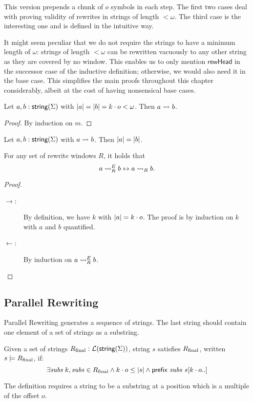 This version prepends a chunk of $o$ symbols in each step. The first two cases deal with proving validity of rewrites in strings of length $< \omega$. The third case is the interesting one and is defined in the intuitive way.

\begin{remark}
  It might seem peculiar that we do not require the strings to have a minimum length of $\omega$: strings of length $< \omega$ can be rewritten vacuously to any other string as they are covered by no window. 
  This enables us to only mention $\textsf{rewHead}$ in the successor case of the inductive definition; otherwise, we would also need it in the base case. This simplifies the main proofs throughout this chapter considerably, albeit at the cost of having nonsensical base cases.
\end{remark}

\begin{proposition}\label{lem:vacuous}
  Let $a, b : \textsf{string}{(\Sigma)}$ with $|a| = |b| = k \cdot o < \omega$. Then $a \rightsquigarrow_{} b$. 
\end{proposition}
\begin{proof}
  By induction on $m$.
\end{proof}

\begin{proposition}
  Let $a, b : \textsf{string}{(\Sigma)}$ with $a \rightsquigarrow_{} b$. Then $|a| = |b|$. 
\end{proposition}

\begin{lemma}\label{lem:agree_valid}
  For any set of rewrite windows $R$, it holds that 
  \[a \rightsquigarrow_{R}^E b \leftrightarrow a \rightsquigarrow_{R} b. \]
\end{lemma}
\begin{proof}
  \begin{description}
    \item[$\rightarrow$:]
      By definition, we have $k$ with $|a| = k \cdot o$. The proof is by induction on $k$ with $a$ and $b$ quantified.
    \item[$\leftarrow$:]
      By induction on $a \rightsquigarrow_{R}^E b$. 
  \end{description}
\end{proof}


\subsection{Parallel Rewriting}
Parallel Rewriting generates a sequence of strings. The last string should contain one element of a set of strings as a substring.
\begin{definition}
  Given a set of strings $R_{\text{final}} : \mathcal{L} (\textsf{string}{(\Sigma)})$, string $s$ satisfies $R_{\text{final}}$, written $s \models R_{\text{final}}$, if:
  \[\exists \mathit{subs}\;k, \mathit{subs} \in R_{\text{final}} \land k \cdot o \le |s| \land \textsf{prefix}~\mathit{subs}~s[k \cdot o..] \]
\end{definition}
The definition requires a string to be a substring at a position which is a multiple of the offset $o$.

